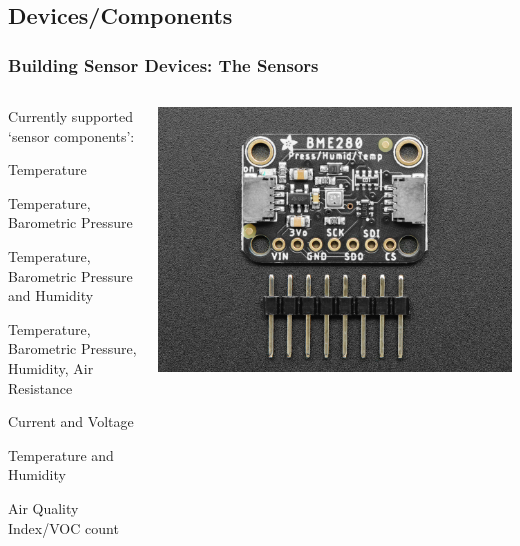 \documentclass[aspectratio=169]{beamer}
\begin{document}
\subsection{Devices/Components}
\begin{frame}[fragile]
  \frametitle{Building Sensor Devices: The Sensors}
  \begin{columns}[]
    \begin{column}[T]{0.45\paperwidth}
      Currently supported `sensor components':
      \begin{description}[leftmargin=2cm]%
        \item[MCP9808]{Temperature}
        \item[BMP280]{Temperature, Barometric Pressure}
        \item[BME280]{Temperature, Barometric Pressure and Humidity}
        \item[BME680]{Temperature, Barometric Pressure, Humidity, Air Resistance}
        \item[INA260/INA219]{Current and Voltage}
        \item[SHTC3/SHT31]{Temperature and Humidity}
        \item[PMSA003I]{Air Quality Index/VOC count}
      \end{description}
    \end{column}
    \begin{column}[T]{0.45\paperwidth}
      \includegraphics[width=0.45\paperwidth,keepaspectratio]{images/bme280-ada.jpg}
    \end{column}
  \end{columns}
\end{frame}
\end{document}
